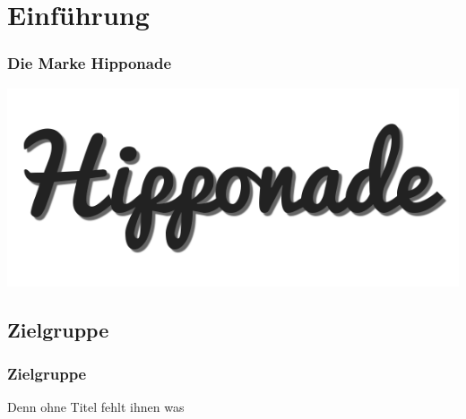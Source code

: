 \section{Einführung} 
\begin{frame}
	\frametitle{Die Marke Hipponade} 
	\includegraphics[scale=0.2]{bilder/logo.png}
\end{frame}

\subsection{Zielgruppe}
\begin{frame}
	\frametitle{Zielgruppe}
	Denn ohne Titel fehlt ihnen was
\end{frame}